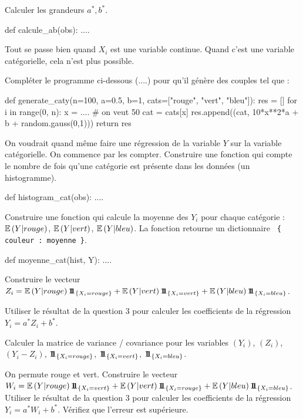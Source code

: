 \begin{xexercice}
\exequest Calculer les grandeurs $a^*, b^*$.

\begin{verbatimx}
def calcule_ab(obs):
    ....
\end{verbatimx}

Tout se passe bien quand $X_i$ est une variable continue.
Quand c'est une variable catégorielle, cela n'est plus possible.

\exequest Compléter le programme ci-dessous (....) pour qu'il génère des couples tel que :

\begin{verbatimx}
\end{verbatimx}

\begin{verbatimx}
def generate_caty(n=100, a=0.5, b=1, cats=["rouge", "vert", "bleu"]):
    res = []
    for i in range(0, n):
        x = ....     # on veut 50%
        cat = cats[x]
        res.append((cat, 10*x**2*a + b + random.gauss(0,1)))
    return res
\end{verbatimx}

\exequest On voudrait quand même faire une régression de la variable $Y$ sur la variable catégorielle. On commence par les compter. Construire une fonction qui compte le nombre de fois qu'une catégorie est présente dans les données (un histogramme).


\begin{verbatimx}
def histogram_cat(obs):
    ....
\end{verbatimx}

\exequest Construire une fonction qui calcule la moyenne des $Y_i$ pour chaque catégorie : $\mathbb{E}\left(Y | rouge\right)$, $\mathbb{E}\left(Y | vert\right)$, $\mathbb{E}\left(Y | bleu\right)$. La fonction retourne un dictionnaire \texttt{ \{ couleur : moyenne \}}.

\begin{verbatimx}
def moyenne_cat(hist, Y):
    ....
\end{verbatimx}

\exequest Construire le vecteur $Z_i = \mathbb{E}\left(Y | rouge\right)\mathbf{1\!\!1}_{\left\{X_i = rouge\right\}} + \mathbb{E}\left(Y | vert\right) \mathbf{1\!\!1}_{\left\{X_i = vert\right\}} + \mathbb{E}\left(Y | bleu\right) \mathbf{1\!\!1}_{\left\{X_i = bleu\right\}}$.

\exequest Utiliser le résultat de la question 3 pour calculer les coefficients de la régression $Y_i = a^* Z_i + b^*$.


\exequest Calculer la matrice de variance / covariance pour les variables $(Y_i)$, $(Z_i)$, $(Y_i - Z_i)$, $\mathbf{1\!\!1}_{\left\{X_i = rouge\right\}}$, $\mathbf{1\!\!1}_{\left\{X_i = vert\right\}}$, $\mathbf{1\!\!1}_{\left\{X_i = bleu\right\}}$. 

\exequest On permute rouge et vert. Construire le vecteur $W_i = \mathbb{E}\left(Y | rouge\right)\mathbf{1\!\!1}_{\left\{X_i = vert\right\}} + \mathbb{E}\left(Y | vert\right) \mathbf{1\!\!1}_{\left\{X_i = rouge\right\}} + \mathbb{E}\left(Y | bleu\right) \mathbf{1\!\!1}_{\left\{X_i = bleu\right\}}$. Utiliser le résultat de la question 3 pour calculer les coefficients de la régression $Y_i = a^* W_i + b^*$.
Vérifiez que l'erreur est supérieure.


\end{xexercice}






%

